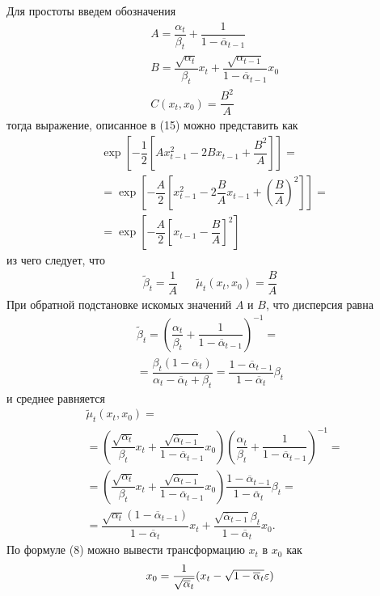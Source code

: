 \documentclass[11pt, a4paper, twocolumn, twoside]{article} %
\begin{document}
Для простоты введем обозначения
\begin{align*}
	& A = \dfrac{\alpha_t}{\beta_t} + \dfrac{1}{1-\overline\alpha_{t-1}} \\
	& B = \dfrac{\sqrt{\alpha_t}}{\beta_t}x_t+ \dfrac{\sqrt{\alpha_{t-1}}}{1-\overline\alpha_{t-1}}x_0 \\
	& C(x_t, x_0) = \dfrac{B^2}{A}
\end{align*}
тогда выражение, описанное в (15) можно представить как
\begin{align*}
	& \exp\left[-\dfrac{1}{2}\left[Ax^2_{t-1} - 2Bx_{t-1}+\dfrac{B^2}{A}\right]\right] = \\
	& = \exp\left[-\dfrac{A}{2}\left[x^2_{t-1} - 2\dfrac{B}{A}x_{t-1}+\left(\dfrac{B}{A}\right)^2 \right]\right] = \\
	& = \exp\left[-\dfrac{A}{2}\left[x_{t-1} - \dfrac{B}{A}\right]^2\right]
\end{align*}
из чего следует, что 
\begin{align*}
	\tilde\beta_t = \dfrac{1}{A} && 
	\tilde\mu_t(x_t, x_0) = \dfrac{B}{A}
\end{align*}
При обратной подстановке искомых значений $A$ и $B$, что дисперсия равна 
\begin{multline*}
	\tilde\beta_t = \left(\dfrac{\alpha_t}{\beta_t} + \dfrac{1}{1-\overline\alpha_{t-1}}\right)^{-1} =\\= \dfrac{\beta_t(1-\overline\alpha_t)}{\alpha_t - \overline\alpha_t + \beta_t} = \dfrac{1 - \overline\alpha_{t-1}}{1 - \overline\alpha_t}\beta_t
\end{multline*}
и среднее равняется 
\begin{align*}
	& \tilde\mu_t(x_t, x_0) = \\
	& = \left(\dfrac{\sqrt{\alpha_t}}{\beta_t}x_t+ \dfrac{\sqrt{\overline\alpha_{t-1}}}{1-\overline\alpha_{t-1}}x_0\right)\left(\dfrac{\alpha_t}{\beta_t} + \dfrac{1}{1-\overline\alpha_{t-1}}\right)^{-1} = \\
	& = \left(\dfrac{\sqrt{\alpha_t}}{\beta_t}x_t+ \dfrac{\sqrt{\overline\alpha_{t-1}}}{1-\overline\alpha_{t-1}}x_0\right)\dfrac{1 - \overline\alpha_{t-1}}{1 - \overline\alpha_t}\beta_t = \\
	& = \dfrac{\sqrt{\alpha_t}(1-\overline\alpha_{t-1})}{1-\overline\alpha_t}x_t + \dfrac{\sqrt{\overline\alpha_{t-1}}\beta_t}{1-\overline\alpha_t}x_0.
\end{align*}
По формуле (8) можно вывести трансформацию $x_t$ в $x_0$ как
\begin{equation*}
	x_0 = \dfrac{1}{\sqrt{\overline\alpha_t}}(x_t - \sqrt{1-\overline\alpha_t}\varepsilon)
\end{equation*} 
\end{document}
